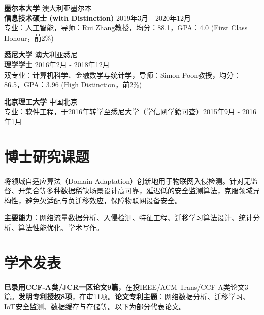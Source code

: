 \documentclass[UTF8,letterpaper,11pt]{article}
\begin{document}
\vspace{9pt}

\textbf{墨尔本大学} \hfill 澳大利亚墨尔本\\
\textbf{信息技术硕士 (with Distinction)} \hfill 2019年3月 - 2020年12月\\
专业：人工智能，导师：Rui Zhang教授，均分：88.1，GPA：4.0 (First Class Honour，前2\%)

\vspace{9pt}

\textbf{悉尼大学} \hfill 澳大利亚悉尼\\
\textbf{理学学士} \hfill 2016年2月 - 2018年12月\\
双专业：计算机科学、金融数学与统计学，导师：Simon Poon教授，均分：86.5，GPA：3.96 (High Distinction，前2\%)

\vspace{9pt}

\textbf{北京理工大学} \hfill 中国北京\\
专业：软件工程，于2016年转学至悉尼大学（学信网学籍可查）\hfill 2015年9月 - 2016年1月\\

\vspace{1pt}




\section{\textbf{博士研究课题}}

将领域自适应算法（Domain Adaptation）创新地用于物联网入侵检测。针对无监督、开集合等多种数据稀缺场景设计高可靠，延迟低的安全监测算法，克服领域异构性，避免欠适配与负迁移效应，保障物联网设备安全。

\textbf{主要能力}：网络流量数据分析、入侵检测、特征工程、迁移学习算法设计、统计分析、算法性能优化、学术写作。

\vspace{1pt}




\section{\textbf{学术发表}}

\textbf{已录用CCF-A类/JCR一区论文9篇}，在投IEEE/ACM Trans/CCF-A类论文3篇。\textbf{发明专利授权8项}，在审11项。\textbf{论文专利主题}：网络数据分析、迁移学习、IoT安全监测、数据缓存与存储等。以下为部分代表论文。
\end{document}
